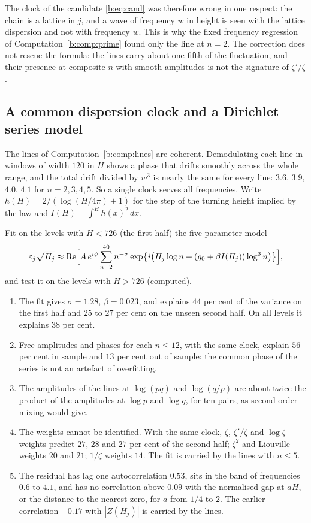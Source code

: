 The clock of the candidate \eqref{b:eq:cand} was therefore wrong in one respect: the chain is a lattice in $j$, and a wave of frequency $w$ in height is seen with the lattice dispersion and not with frequency $w$. This is why the fixed frequency regression of Computation~\ref{b:comp:prime} found only the line at $n=2$. The correction does not rescue the formula: the lines carry about one fifth of the fluctuation, and their presence at composite $n$ with smooth amplitudes is not the signature of $\zeta'/\zeta$.

\subsection{A common dispersion clock and a Dirichlet series model}

The lines of Computation~\ref{b:comp:lines} are coherent. Demodulating each line in windows of width $120$ in $H$ shows a phase that drifts smoothly across the whole range, and the total drift divided by $w^3$ is nearly the same for every line: $3.6$, $3.9$, $4.0$, $4.1$ for $n=2,3,4,5$. So a single clock serves all frequencies. Write $h(H)=2/(\log(H/4\pi)+1)$ for the step of the turning height implied by the law and $I(H)=\int^{H}h(x)^2\,dx$.

\begin{remark}\label{b:comp:clock}
Fit on the levels with $H<726$ (the first half) the five parameter model
\[
\varepsilon_j\sqrt{H_j}\approx \operatorname{Re}\Bigl[A\,e^{i\phi}\sum_{n=2}^{40}n^{-\sigma}
\exp\bigl\{i\bigl(H_j\log n+(g_0+\beta I(H_j))\log^3 n\bigr)\bigr\}\Bigr],
\]
and test it on the levels with $H>726$ (computed).
\begin{enumerate}
\item The fit gives $\sigma=1.28$, $\beta=0.023$, and explains $44$ per cent of the variance on the first half and $25$ to $27$ per cent on the unseen second half. On all levels it explains $38$ per cent.
\item Free amplitudes and phases for each $n\le12$, with the same clock, explain $56$ per cent in sample and $13$ per cent out of sample: the common phase of the series is not an artefact of overfitting.
\item The amplitudes of the lines at $\log(pq)$ and $\log(q/p)$ are about twice the product of the amplitudes at $\log p$ and $\log q$, for ten pairs, as second order mixing would give.
\item The weights cannot be identified. With the same clock, $\zeta$, $\zeta'/\zeta$ and $\log\zeta$ weights predict $27$, $28$ and $27$ per cent of the second half; $\zeta^2$ and Liouville weights $20$ and $21$; $1/\zeta$ weights $14$. The fit is carried by the lines with $n\le5$.
\item The residual has lag one autocorrelation $0.53$, sits in the band of frequencies $0.6$ to $4.1$, and has no correlation above $0.09$ with the normalised gap at $aH$, or the distance to the nearest zero, for $a$ from $1/4$ to $2$. The earlier correlation $-0.17$ with $|Z(H_j)|$ is carried by the lines.
\end{enumerate}
\end{remark}

